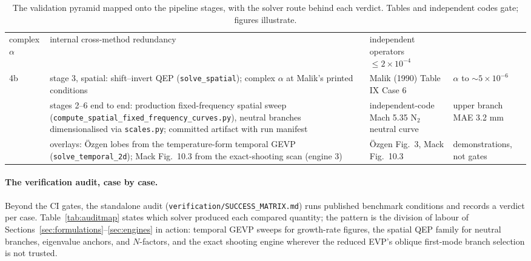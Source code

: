 \documentclass[11pt]{article}
\begin{document}
\begin{table}[H]
\begin{tabular}{@{}>{\raggedright\arraybackslash}p{0.7cm}>{\raggedright\arraybackslash}p{5.9cm}
>{\raggedright\arraybackslash}p{4.4cm}>{\raggedright\arraybackslash}p{3.2cm}@{}}
    complex $\alpha$ & internal cross-method redundancy & independent operators
    $\le2\times10^{-4}$ \\
4b & stage 3, spatial: shift--invert QEP (\texttt{solve\_spatial}); complex $\alpha$ at
    Malik's printed conditions & Malik (1990) Table IX Case 6 \cite{malik1990} & $\alpha$ to
    ${\sim}5\times10^{-6}$ \\
5 & stages 2--6 end to end: production fixed-frequency spatial sweep
    (\texttt{compute\_spatial\_fixed\_frequency\_curves.py}), neutral branches
    dimensionalised via \texttt{scales.py}; committed artifact with run manifest &
    independent-code Mach 5.35 N$_2$ neutral curve & upper branch MAE 3.2 mm \\
6 & overlays: \"Ozgen lobes from the temperature-form temporal GEVP
    (\texttt{solve\_temporal\_2d}); Mack Fig.~10.3 from the exact-shooting scan (engine 3) &
    \"Ozgen Fig.~3, Mack Fig.~10.3 \cite{ozgen2008,mack1984} & demonstrations, not gates \\
\bottomrule
\end{tabular}
\caption{The validation pyramid mapped onto the pipeline stages, with the solver route behind
each verdict. Tables and independent codes gate; figures illustrate.}
\label{tab:valmap}
\end{table}

\paragraph{The verification audit, case by case.} Beyond the CI gates, the standalone audit
(\texttt{verification/}\allowbreak\texttt{SUCCESS\_MATRIX.md}) runs published benchmark conditions and records a
verdict per case. Table~\ref{tab:auditmap} states which solver produced each compared quantity;
the pattern is the division of labour of Sections~\ref{sec:formulations}--\ref{sec:engines} in
action: temporal GEVP sweeps for growth-rate figures, the spatial QEP family for neutral
branches, eigenvalue anchors, and $N$-factors, and the exact shooting engine wherever the
reduced EVP's oblique first-mode branch selection is not trusted.
\end{document}
